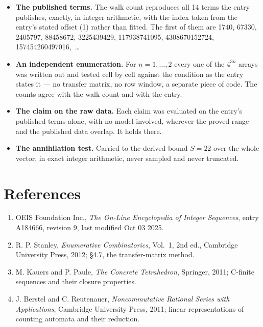 \documentclass[11pt]{article}
\theoremstyle{definition}
\begin{document}
\begin{itemize}

\item {\bfseries The published terms.} The walk count reproduces all 14 terms the entry publishes, exactly, in integer arithmetic, with the index taken from the entry's stated offset (1) rather than fitted. The first of them are 1740, 67330, 2405797, 88458672, 3225439429, 117938741095, 4308670152724, 157454260497016,~\dots

\item {\bfseries An independent enumeration.} For $n = 1,\dots,2$ every one of the $4^{3n}$ arrays was written out and tested cell by cell against the condition as the entry states it --- no transfer matrix, no row window, a separate piece of code. The counts agree with the walk count and with the entry.

\item {\bfseries The claim on the raw data.} Each claim was evaluated on the entry's published terms alone, with no model involved, wherever the proved range and the published data overlap. It holds there.

\item {\bfseries The annihilation test.} Carried to the derived bound $S = 22$ over the whole vector, in exact integer arithmetic, never sampled and never truncated.

\end{itemize}

\section{References}

\begin{enumerate}

\item OEIS Foundation Inc., \emph{The On-Line Encyclopedia of Integer Sequences}, entry \href{https://oeis.org/A184666}{A184666}, revision 9, last modified Oct 03 2025.

\item R. P. Stanley, \emph{Enumerative Combinatorics}, Vol.~1, 2nd ed., Cambridge University Press, 2012; \S4.7, the transfer-matrix method.

\item M. Kauers and P. Paule, \emph{The Concrete Tetrahedron}, Springer, 2011; C-finite sequences and their closure properties.

\item J. Berstel and C. Reutenauer, \emph{Noncommutative Rational Series with Applications}, Cambridge University Press, 2011; linear representations of counting automata and their reduction.

\end{enumerate}
\end{document}
